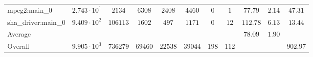 \begin{tabular}{|l|c|c|c|c|c|c|c|c|c|c|}
mpeg2:main\_0       & $ 2.743 \cdot 10^{1} $ & $ 2134   $ & $ 6308  $ & $ 2408  $ & $ 4460  $ & $ 0   $ & $ 1   $ & $ 77.79       $ & $ 2.14    $ & $ 47.31   $ \\
sha\_driver:main\_0 & $ 9.409 \cdot 10^{2} $ & $ 106113 $ & $ 1602  $ & $ 497   $ & $ 1171  $ & $ 0   $ & $ 12  $ & $ 112.78      $ & $ 6.13    $ & $ 13.44   $ \\
\hline
Average             & $                    $ & $        $ & $       $ & $       $ & $       $ & $     $ & $     $ & $ 78.09       $ & $ 1.90    $ & $         $ \\
\hline
Overall             & $ 9.905 \cdot 10^{3} $ & $ 736279 $ & $ 69460 $ & $ 22538 $ & $ 39044 $ & $ 198 $ & $ 112 $ & $             $ & $         $ & $ 902.97  $ \\
\hline
\end{tabular}
